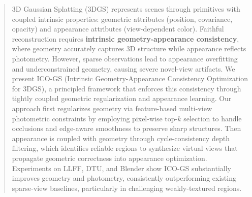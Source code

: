 \begin{abstract}
3D Gaussian Splatting (3DGS) represents scenes through primitives with coupled intrinsic properties: geometric attributes (position, covariance, opacity) and appearance attributes (view-dependent color). 
Faithful reconstruction requires \textbf{intrinsic geometry-appearance consistency}, where geometry accurately captures 3D structure while appearance reflects photometry. 
However, sparse observations lead to appearance overfitting and underconstrained geometry, causing severe novel-view artifacts.
We present ICO-GS (Intrinsic Geometry-Appearance Consistency Optimization for 3DGS), a principled framework that enforces this consistency through tightly coupled geometric regularization and appearance learning. 
Our approach first regularizes geometry via feature-based multi-view photometric 
constraints by employing pixel-wise top-$k$ selection to handle occlusions and 
edge-aware smoothness to preserve sharp structures.
Then appearance is coupled with geometry through cycle-consistency depth filtering, which identifies reliable regions to synthesize virtual views that propagate geometric correctness into appearance optimization. 
Experiments on LLFF, DTU, and Blender show ICO-GS substantially improves geometry 
and photometry, consistently outperforming existing sparse-view baselines, particularly in challenging weakly-textured regions.
\end{abstract}





